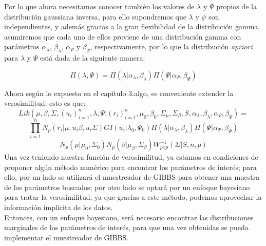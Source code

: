 Por lo que ahora necesitamos conocer también los valores de $\lambda$ y $\Psi$ propios de la distribución gaussiana inversa, para ello supondremos que $\lambda$ y $\psi$ son independientes, y además gracias a la gran flexibilidad de la distribución gamma, asumiremos que cada uno de ellos proviene de una distribución gamma con parámetros $\alpha_{\lambda}$, $\beta_{\lambda}$, $\alpha_{\Psi}$ y $\beta_{\Psi}$, respectivamente, por lo que la distribución \textit{apriori} para $\lambda$ y $\Psi$ está dada de la siguiente manera:

\begin{equation*}
\Pi(\lambda,\Psi)=\Pi(\lambda|\alpha_{\lambda},\beta_{\lambda})\Pi(\Psi|\alpha_{\Psi},\beta_{\Psi})
\end{equation*}

Ahora según lo expuesto en el capítulo 3.algo, es conveniente extender la verosimilitud; esto es que:
\begin{equation*}
Lik(\mu,\beta,\Sigma,(u_{i})_{i=1}^{n},\lambda,\Psi|(r_{i})_{i=1}^{n},\mu_{0},\beta_{0},\Sigma_{\mu},\Sigma_{\beta},S,\alpha_{\lambda},\beta_{\lambda},\alpha_{\Psi},\beta_{\Psi})=
\end{equation*}
\begin{equation*}
\prod_{i=1}^{n}N_{p}(r_{i}|\mu,u_{i}\beta,u_{i}\Sigma)GI(u_{i}|\lambda_{0},\Psi_{0})\Pi(\lambda|\alpha_{\lambda},\beta_{\lambda})\Pi(\Psi|\alpha_{\Psi},\beta_{\Psi}) 
\end{equation*}
\begin{equation*}
N_{p}(\mu|\mu_{0},\Sigma_{0})N_{p}(\beta|\mu_{\beta},\Sigma_{\beta})W^{-1}_{pxp}(\Sigma|S,n,p)
\end{equation*}
Una vez teniendo nuestra función de verosimilitud, ya estamos en condiciones de proponer algún método numérico para encontrar los parámetros de interés; para ello, por un lado se utilizará el muestreador de GIBBS para obtener una muestra de los parámetros buscados; por otro lado se optará por un enfoque bayesiano para tratar la verosimilitud, ya que gracias a este método, podemos aprovechar la información implícita de los datos.\\

Entonces, con un enfoque bayesiano, será necesario encontrar las distribuciones marginales de los parámetros de interés, para que una vez obtenidas se pueda implementar el muestreador de GIBBS.\\ 


